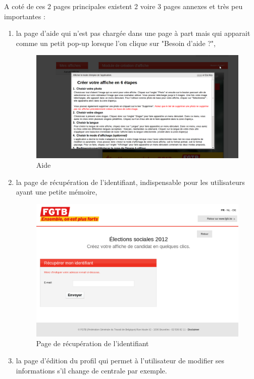 \documentclass{article}
\begin{document}
\begin{sffamily}
A coté de ces 2 pages principales existent 2 voire 3 pages annexes et très peu importantes :
\begin{enumerate}
\item la page d'aide qui n'est pas chargée dans une page à part mais qui apparait comme un petit pop-up lorsque l'on clique sur "Besoin d'aide ?",
\begin{figure}[h!]
	\begin{center}
		\includegraphics[width=\textwidth]{ergo_004.png} 
		\caption{Aide}
	\end{center}
\end{figure}
\item la page de récupération de l'identifiant, indispensable pour les utilisateurs ayant une petite mémoire,
\begin{figure}[h!]
	 \begin{center}
	   \includegraphics[width=\textwidth]{ergo_021.png} 
	   \caption{Page de récupération de l'identifiant}
	\end{center}
\end{figure}
\item la page d'édition du profil qui permet à l'utilisateur de modifier ses informations s'il change de centrale par exemple.

\end{enumerate}
\end{sffamily}
\end{document}
